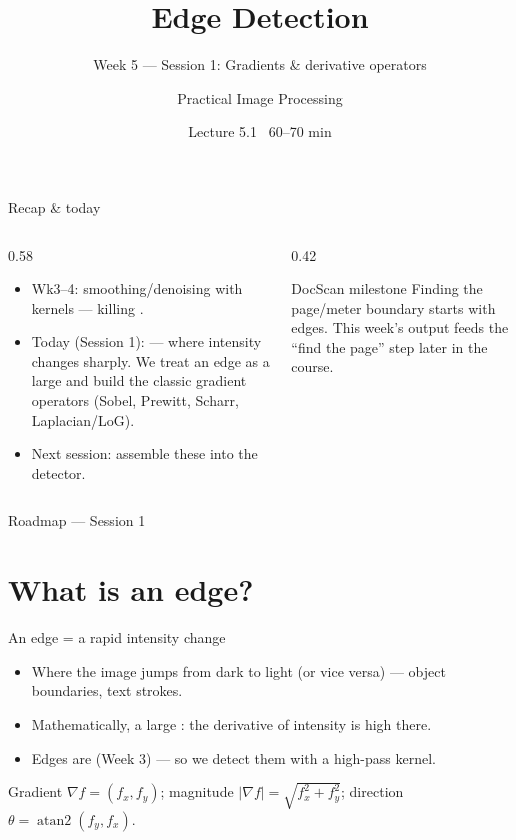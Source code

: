 \documentclass[10pt,aspectratio=169]{beamer}
\title{Edge Detection}
\subtitle{Week 5 — Session 1: Gradients \& derivative operators}
\author{Practical Image Processing}
\date{Lecture 5.1 \textbullet\ 60--70 min}
\begin{document}
\maketitle

\begin{frame}{Recap \& today}
  \begin{columns}[T]
    \begin{column}{0.58\textwidth}
      \begin{itemize}
        \item Wk3--4: smoothing/denoising with kernels — killing .
        \item \alert{Today (Session 1):}  — where intensity changes sharply.
              We treat an edge as a large  and build the classic
              gradient operators (Sobel, Prewitt, Scharr, Laplacian/LoG).
        \item Next session: assemble these into the  detector.
      \end{itemize}
    \end{column}
    \begin{column}{0.42\textwidth}
      \begin{alertblock}{DocScan milestone}
        Finding the page/meter boundary starts with edges. This week's output feeds the
        ``find the page'' step later in the course.
      \end{alertblock}
    \end{column}
  \end{columns}
\end{frame}

\begin{frame}{Roadmap — Session 1}\tableofcontents\end{frame}

\section{What is an edge?}

\begin{frame}{An edge = a rapid intensity change}
  \begin{itemize}
    \item Where the image jumps from dark to light (or vice versa) — object boundaries, text strokes.
    \item Mathematically, a large : the derivative of intensity is high there.
    \item Edges are  (Week 3) — so we detect them with a high-pass kernel.
  \end{itemize}
  \begin{mathbox}
    Gradient $\nabla f = (f_x, f_y)$; magnitude $|\nabla f| = \sqrt{f_x^2 + f_y^2}$;
    direction $\theta=\operatorname{atan2}(f_y,f_x)$.
  \end{mathbox}
\end{frame}
\end{document}

